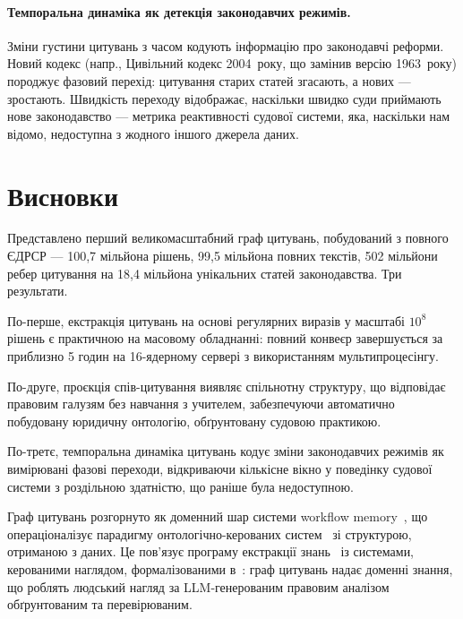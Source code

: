 \documentclass[11pt]{article}
\begin{document}
\paragraph{Темпоральна динаміка як детекція законодавчих режимів.}
Зміни густини цитувань з часом кодують інформацію про законодавчі реформи.
Новий кодекс (напр., Цивільний кодекс 2004~року, що замінив версію 1963~року) породжує фазовий перехід: цитування старих статей згасають, а нових --- зростають.
Швидкість переходу відображає, наскільки швидко суди приймають нове законодавство --- метрика реактивності судової системи, яка, наскільки нам відомо, недоступна з жодного іншого джерела даних.


\section{Висновки}
\label{sec:conclusion}

Представлено перший великомасштабний граф цитувань, побудований з повного ЄДРСР --- 100,7 мільйона рішень, 99,5 мільйона повних текстів, 502 мільйони ребер цитування на 18,4 мільйона унікальних статей законодавства.
Три результати.

По-перше, екстракція цитувань на основі регулярних виразів у масштабі $10^8$ рішень є практичною на масовому обладнанні: повний конвеєр завершується за приблизно 5 годин на 16-ядерному сервері з використанням мультипроцесінгу.

По-друге, проєкція спів-цитування виявляє спільнотну структуру, що відповідає правовим галузям без навчання з учителем, забезпечуючи автоматично побудовану юридичну онтологію, обґрунтовану судовою практикою.

По-третє, темпоральна динаміка цитувань кодує зміни законодавчих режимів як вимірювані фазові переходи, відкриваючи кількісне вікно у поведінку судової системи з роздільною здатністю, що раніше була недоступною.

Граф цитувань розгорнуто як доменний шар системи workflow memory~\citep{ovcharov2026workflowmemory}, що операціоналізує парадигму онтологічно-керованих систем~\citep{palagin2006architecture} зі структурою, отриманою з даних.
Це пов'язує програму екстракції знань~\citet{palagin2012knowledge} із системами, керованими наглядом, формалізованими в~\citet{ovcharov2026bridge}: граф цитувань надає доменні знання, що роблять людський нагляд за LLM-генерованим правовим аналізом обґрунтованим та перевірюваним.




\end{document}
